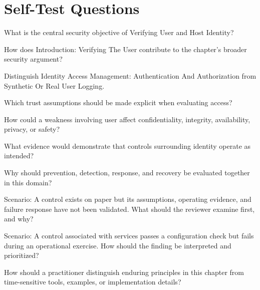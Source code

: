 \documentclass[11pt,letterpaper]{article}
\begin{document}
\section*{Self-Test Questions}
\begin{CornellRecallList}
\item What is the central security objective of Verifying User and Host Identity?
\item How does Introduction: Verifying The User contribute to the chapter's broader security argument?
\item Distinguish Identity Access Management: Authentication And Authorization from Synthetic Or Real User Logging.
\item Which trust assumptions should be made explicit when evaluating access?
\item How could a weakness involving user affect confidentiality, integrity, availability, privacy, or safety?
\item What evidence would demonstrate that controls surrounding identity operate as intended?
\item Why should prevention, detection, response, and recovery be evaluated together in this domain?
\item Scenario: A control exists on paper but its assumptions, operating evidence, and failure response have not been validated. What should the reviewer examine first, and why?
\item Scenario: A control associated with services passes a configuration check but fails during an operational exercise. How should the finding be interpreted and prioritized?
\item How should a practitioner distinguish enduring principles in this chapter from time-sensitive tools, examples, or implementation details?
\end{CornellRecallList}
\end{document}
